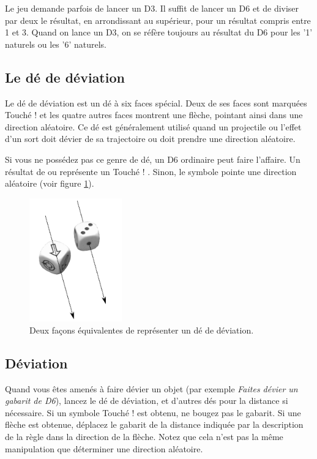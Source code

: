Le jeu demande parfois de lancer un D3. Il suffit de lancer un D6 et de diviser par deux le résultat, en arrondissant au supérieur, pour un résultat compris entre 1 et 3. Quand on lance un D3, on se réfère toujours au résultat du D6 pour les '1' naturels ou les '6' naturels.

\subsection{Le dé de déviation}

Le dé de déviation est un dé à six faces spécial. Deux de ses faces sont marquées \og Touché ! \fg{} et les quatre autres faces montrent une flèche, pointant ainsi dans une direction aléatoire. Ce dé est généralement utilisé quand un projectile ou l'effet d'un sort doit dévier de sa trajectoire ou doit prendre une direction aléatoire.

Si vous ne possédez pas ce genre de dé, un D6 ordinaire peut faire l'affaire. Un résultat de  ou  représente un \og Touché ! \fg . Sinon, le symbole  pointe une direction aléatoire (voir figure \ref{figure/de_deviation}).

\begin{figure}[!htbp]
\centering
\includegraphics[width=4cm]{de_deviation.png}
\caption{Deux façons équivalentes de représenter un dé de déviation.}
\label{figure/de_deviation}
\end{figure}

\subsection{Déviation}

Quand vous êtes amenés à faire dévier un objet (par exemple \emph{Faites dévier un gabarit de D6{\pouce}}), lancez le dé de déviation, et d'autres dés pour la distance si nécessaire. Si un symbole \og Touché ! \fg{} est obtenu, ne bougez pas le gabarit. Si une flèche est obtenue, déplacez le gabarit de la distance indiquée par la description de la règle dans la direction de la flèche. Notez que cela n'est pas la même manipulation que déterminer une direction aléatoire.

